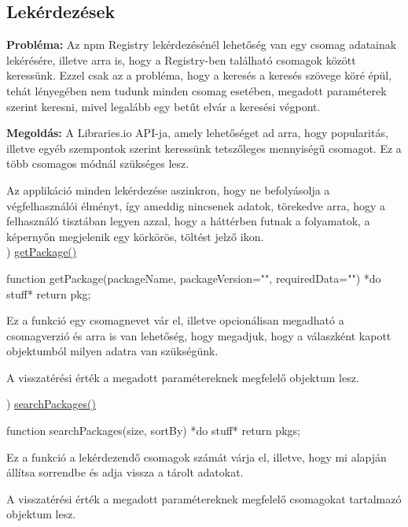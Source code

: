 \pagebreak

\subsection{Lekérdezések}

\textbf{Probléma:} Az npm Registry lekérdezésénél lehetőség van egy csomag adatainak lekérésére, illetve arra is, hogy a Registry-ben található csomagok között keressünk. Ezzel csak az a probléma, hogy a keresés a keresés szövege köré épül, tehát lényegében nem tudunk minden csomag esetében, megadott paraméterek szerint keresni, mivel legalább egy betűt elvár a keresési végpont.

\textbf{Megoldás:} A Libraries.io API-ja, amely lehetőséget ad arra, hogy popularitás, illetve egyéb szempontok szerint keressünk tetszőleges mennyiségű csomagot. Ez a több csomagos módnál szükséges lesz.

Az applikáció minden lekérdezése aszinkron, hogy ne befolyásolja a végfelhasználói élményt, így ameddig nincsenek adatok, törekedve arra, hogy a felhasználó tisztában legyen azzal, hogy a háttérben futnak a folyamatok, a képernyőn megjelenik egy körkörös, töltést jelző ikon.\\

) \underline{getPackage()}\\

\begin{js}
function getPackage(packageName, packageVersion="", requiredData=""){
	*do stuff*
	return pkg;
}
\end{js}

Ez a funkció egy csomagnevet vár el, illetve opcionálisan megadható a csomagverzió és arra is van lehetőség, hogy megadjuk, hogy a válaszként kapott objektumból milyen adatra van szükségünk.

A visszatérési érték a megadott paramétereknek megfelelő objektum lesz.

) \underline{searchPackages()}\\

\begin{js}
function searchPackages(size, sortBy){
	*do stuff*
	return pkgs;
}
\end{js}

Ez a funkció a lekérdezendő csomagok számát várja el, illetve, hogy mi alapján állítsa sorrendbe és adja vissza a tárolt adatokat.

A visszatérési érték a megadott paramétereknek megfelelő csomagokat tartalmazó objektum lesz.

